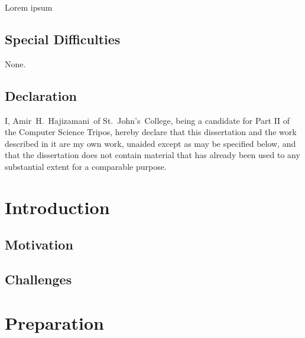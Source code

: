 \documentclass[a4paper,12pt,twoside,notitlepage,draft]{report}
\def\authorname{Amir~H.~Hajizamani}
\def\authorcollege{St.~John's~College}
\begin{document}
Lorem ipsum

\section*{Special Difficulties}

None.

\clearpage

\section*{Declaration}

I, \authorname~of \authorcollege, being a candidate for Part II of the Computer
Science Tripos, hereby declare that this dissertation and the work described in
it are my own work, unaided except as may be specified below, and that
the dissertation does not contain material that has already been used to any
substantial extent for a comparable purpose.

\bigskip
{}

\medskip
{}

\vfill

\clearpage

\tableofcontents
\clearpage




\chapter{Introduction}

\section{Motivation}

\section{Challenges}

\chapter{Preparation}
\end{document}
